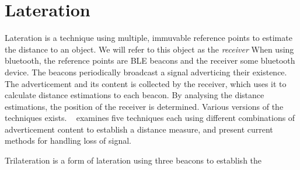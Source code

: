 \section{Lateration}
Lateration is a technique using multiple, immuvable reference points to estimate the distance to an object\cite{presence_ble_review}.
We will refer to this object as the \textit{receiver}   
When using bluetooth, the reference points are BLE beacons and the receiver some bluetooth device. 
The beacons periodically broadcast a signal adverticing their existence. 
The adverticement and its content is collected by the receiver, which uses it to calculate distance estimations to each beacon. 
By analysing the distance estimations, the position of the receiver is determined.
Various versions of the techniques exists.
\citeauthor{presence_ble_review}~\cite{presence_ble_review} examines five techniques each using different combinations of adverticement content to establish a distance measure, and present current methods for handling loss of signal.

Trilateration is a form of lateration using three beacons to establish the 

